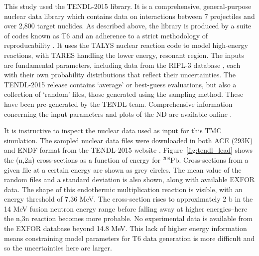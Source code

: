 
This study used the TENDL-2015 library. It is a comprehensive, general-purpose nuclear data library which contains data on interactions between 7 projectiles and over 2,800 target nuclides. As described above, the library is produced by a suite of codes known as T6 and an adherence to a strict methodology of reproducability \cite{Rochman2016}. It uses the TALYS nuclear reaction code to model high-energy reactions, with TARES handling the lower energy, resonant region. The inputs are fundamental parameters, including data from the RIPL-3 database \cite{Capote2009}, each with their own probability distributions that reflect their uncertainties. The TENDL-2015 release contains `average' or best-guess evaluations, but also a collection of `random' files, those generated using the sampling method. These have been pre-generated by the TENDL team. Comprehensive information concerning the input parameters and plots of the ND are available online \cite{TENDL2015}.

It is instructive to inspect the nuclear data used as input for this TMC simulation. The sampled nuclear data files were downloaded in both ACE (293K) and ENDF format from the TENDL-2015 website \cite{TENDL2015}. Figure~\ref{fig:tendl_lead} shows the (n,2n) cross-sections as a function of energy for $^{208}$Pb. Cross-sections from a given file at a certain energy are shown as grey circles. The mean value of the random files and a standard deviation is also shown, along with available EXFOR data. The shape of this endothermic multiplication reaction is visible, with an energy threshold of 7.36 MeV. The cross-section rises to approximately 2 b in the 14 MeV fusion neutron energy range before falling away at higher energies--here the n,3n reaction becomes more probable. No experimental data is available from the EXFOR database beyond 14.8 MeV. This lack of higher energy information means constraining model parameters for T6 data generation is more difficult and so the uncertainties here are larger.


